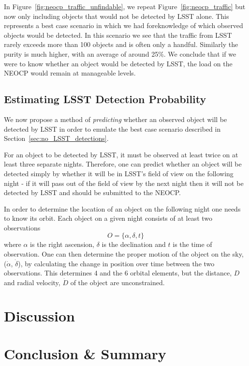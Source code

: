 \documentclass[twocolumn, twocolappendix]{aastex631}
\begin{document}
In Figure~\ref{fig:neocp_traffic_unfindable}, we repeat Figure~\ref{fig:neocp_traffic} but now only including objects that would not be detected by LSST alone. This represents a best case scenario in which we had foreknowledge of which observed objects would be detected. In this scenario we see that the traffic from LSST rarely exceeds more than 100 objects and is often only a handful. Similarly the purity is much higher, with an average of around 25\%. We conclude that if we were to know whether an object would be detected by LSST, the load on the NEOCP would remain at manageable levels.

\subsection{Estimating LSST Detection Probability}
We now propose a method of \textit{predicting} whether an observed object will be detected by LSST in order to emulate the best case scenario described in Section~\ref{sec:no_LSST_detections}.

For an object to be detected by LSST, it must be observed at least twice on at least three separate nights. Therefore, one can predict whether an object will be detected simply by whether it will be in LSST's field of view on the following night - if it will pass out of the field of view by the next night then it will not be detected by LSST and should be submitted to the NEOCP.

In order to determine the location of an object on the following night one needs to know its orbit. Each object on a given night consists of at least two observations
\begin{equation}
    O = \{ \alpha, \delta, t \}
\end{equation}
where $\alpha$ is the right ascension, $\delta$ is the declination and $t$ is the time of observation. One can then determine the proper motion of the object on the sky, ($\dot{\alpha}$, $\dot{\delta}$), by calculating the change in position over time between the two observations. This determines 4 and the 6 orbital elements, but the distance, $D$ and radial velocity, $\dot{D}$ of the object are unconstrained.

\section{Discussion} \label{sec:discussion}

\section{Conclusion \& Summary} \label{sec:conclusion}
\end{document}
